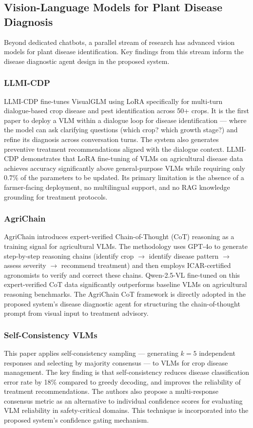 \documentclass[12pt,a4paper]{article}
\begin{document}
\subsection{Vision-Language Models for Plant Disease Diagnosis}
Beyond dedicated chatbots, a parallel stream of research has advanced vision models for plant disease identification. Key findings from this stream inform the disease diagnostic agent design in the proposed system.

\subsubsection{LLMI-CDP \cite{llmiCdp2025}}
LLMI-CDP fine-tunes VisualGLM using LoRA specifically for multi-turn dialogue-based crop disease and pest identification across 50+ crops. It is the first paper to deploy a VLM within a dialogue loop for disease identification --- where the model can ask clarifying questions (which crop? which growth stage?) and refine its diagnosis across conversation turns. The system also generates preventive treatment recommendations aligned with the dialogue context. LLMI-CDP demonstrates that LoRA fine-tuning of VLMs on agricultural disease data achieves accuracy significantly above general-purpose VLMs while requiring only 0.7\% of the parameters to be updated. Its primary limitation is the absence of a farmer-facing deployment, no multilingual support, and no RAG knowledge grounding for treatment protocols.

\subsubsection{AgriChain \cite{agrichain2025}}
AgriChain introduces expert-verified Chain-of-Thought (CoT) reasoning as a training signal for agricultural VLMs. The methodology uses GPT-4o to generate step-by-step reasoning chains (identify crop $\to$ identify disease pattern $\to$ assess severity $\to$ recommend treatment) and then employs ICAR-certified agronomists to verify and correct these chains. Qwen-2.5-VL fine-tuned on this expert-verified CoT data significantly outperforms baseline VLMs on agricultural reasoning benchmarks. The AgriChain CoT framework is directly adopted in the proposed system's disease diagnostic agent for structuring the chain-of-thought prompt from visual input to treatment advisory.

\subsubsection{Self-Consistency VLMs \cite{selfconsistency2025}}
This paper applies self-consistency sampling --- generating $k=5$ independent responses and selecting by majority consensus --- to VLMs for crop disease management. The key finding is that self-consistency reduces disease classification error rate by 18\% compared to greedy decoding, and improves the reliability of treatment recommendations. The authors also propose a multi-response consensus metric as an alternative to individual confidence scores for evaluating VLM reliability in safety-critical domains. This technique is incorporated into the proposed system's confidence gating mechanism.
\end{document}
